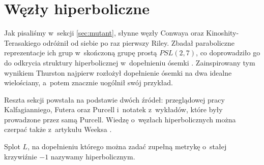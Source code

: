 \section{Węzły hiperboliczne}
\label{sec:hyperbolic}
Jak pisaliśmy w~sekcji \ref{sec:mutant}, słynne węzły Conwaya oraz Kinoshity-Terasakiego odróżnił od siebie po raz pierwszy Riley.
%
%
Zbadał paraboliczne reprezentacje ich grup w~skończoną grupę prostą $PSL(2, 7)$, co doprowadziło go do odkrycia struktury hiperbolicznej w~dopełnieniu ósemki \cite{riley75}.
Zainspirowany tym wynikiem Thurston najpierw rozłożył dopełnienie ósemki na dwa idealne wielościany, a~potem znacznie uogólnił swój przykład.

Reszta sekcji powstała na podstawie dwóch źródeł: przeglądowej pracy Kalfagianniego, Futera oraz Purcell \cite{purcell19} i~notatek z~wykładów, które były prowadzone przez samą Purcell.
Wiedzę o~węzłach hiperbolicznych można czerpać także z~artykułu Weeksa \cite{weeks05}.








\begin{definition}[hiperboliczny]
    Splot $L$, na dopełnieniu którego można zadać zupełną metrykę o~stałej krzywiźnie $-1$ nazywamy hiperbolicznym.
\end{definition}

